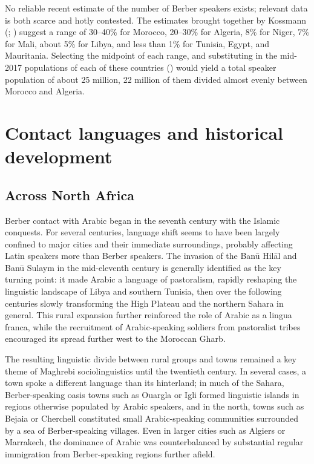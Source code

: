 \documentclass[output=paper]{langsci/langscibook}
\begin{document}
No reliable recent estimate of the number of Berber speakers exists; relevant data is both scarce and hotly contested. The estimates brought together by Kossmann (\citeyear[1]{Kossmann2011}; \citeyear[29--36]{Kossmann2013book}) suggest a range of 30–40\% for Morocco, 20–30\% for Algeria, 8\% for Niger, 7\% for Mali, about 5\% for Libya, and less than 1\% for Tunisia, Egypt, and Mauritania.  Selecting the midpoint of each range, and substituting in the mid-2017 populations of each of these countries (\citealt{CIA2017}) would yield a total speaker population of about 25 million, 22 million of them divided almost evenly between Morocco and Algeria.


 \section{Contact languages and historical development}


 \subsection{Across North Africa} \label{na}


Berber contact with Arabic began in the seventh century with the Islamic conquests. For several centuries, language shift seems to have been largely confined to major cities and their immediate surroundings, probably affecting Latin speakers more than Berber speakers. The invasion of the Banū Hilāl and Banū Sulaym in the mid-eleventh century is generally identified as the key turning point: it made Arabic a language of pastoralism, rapidly reshaping the linguistic landscape of Libya and southern Tunisia, then over the following centuries slowly transforming the High Plateau and the northern Sahara in general.  This rural expansion further reinforced the role of Arabic as a lingua franca, while the recruitment of Arabic-speaking soldiers from pastoralist tribes encouraged its spread further west to the Moroccan Gharb.

The resulting linguistic divide between rural groups and towns remained a key theme of Maghrebi sociolinguistics until the twentieth century. In several cases, a town spoke a different language than its hinterland; in much of the Sahara, Berber-speaking oasis towns such as Ouargla or Igli formed linguistic islands in regions otherwise populated by Arabic speakers, and in the north, towns such as Bejaia or Cherchell constituted small Arabic-speaking communities surrounded by a sea of Berber-speaking villages. Even in larger cities such as Algiers or Marrakech, the dominance of Arabic was counterbalanced by substantial regular immigration from Berber-speaking regions further afield.
\end{document}
